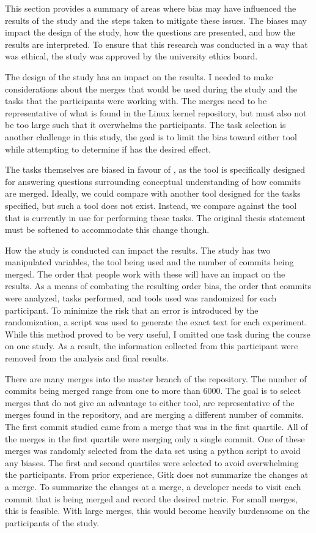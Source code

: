 This section provides a summary of areas where bias may have influenced
the results of the study and the steps taken to mitigate these issues.
The biases may impact the design of the study, how the questions are
presented, and how the results are interpreted.
To ensure that this research was conducted in a way that was ethical,
the study was approved by the university ethics board.

The design of the study has an impact on the results.
I needed to make considerations about the merges that would be used
during the study and the tasks that the participants were working with.
The merges need to be representative of what is found in the Linux
kernel repository, but must also not be too large such that it
overwhelms the participants.
The task selection is another challenge in this study, the goal is to
limit the bias toward either tool while attempting to determine if
\tool{} has the desired effect.


The tasks themselves are biased in favour of \tool{}, as the tool is
specifically designed for answering questions surrounding conceptual
understanding of how commits are merged.
Ideally, we could compare \tool{} with another tool designed for the
tasks specified, but such a tool does not exist.
Instead, we compare against the tool that is currently in use for
performing these tasks.
The original thesis statement must be softened to accommodate this
change though.

How the study is conducted can impact the results.
The study has two manipulated variables, the tool being used and the
number of commits being merged.
The order that people work with these will have an impact on the
results.
As a means of combating the resulting order bias, the order that commits
were analyzed, tasks performed, and tools used was randomized for each
participant.
To minimize the risk that an error is introduced by the randomization, a
script was used to generate the exact text for each experiment.
While this method proved to be very useful,
I omitted one task during the course on one study.
As a result, the information collected from this participant were
removed from the analysis and final results.

There are many merges into the master branch of the repository.
The number of commits being merged range from one to more than 6000.
The goal is to select merges that do not give an advantage to either
tool, are representative of the merges found in the repository, and are
merging a different number of commits.
The first commit studied came from a merge that was in the first
quartile.
All of the merges in the first quartile were merging only a single
commit.
One of these merges was randomly selected from the data set using a
python script to avoid any biases.
The first and second quartiles were selected to avoid overwhelming the
participants.
From prior experience, Gitk does not summarize the changes at a merge.
To summarize the changes at a merge, a developer needs to visit each
commit that is being merged and record the desired metric.
For small merges, this is feasible.
With large merges, this would become heavily burdensome on the
participants of the study.


